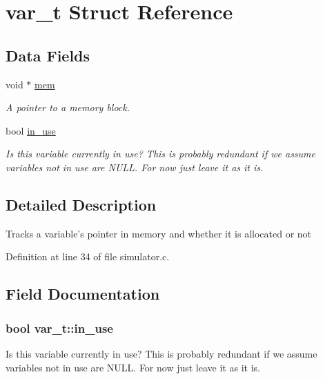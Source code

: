 \hypertarget{structvar__t}{\section{var\-\_\-t Struct Reference}
\label{structvar__t}
}
\subsection*{Data Fields}
\begin{DoxyCompactItemize}
\item 
void $\ast$ \hyperlink{structvar__t_a10c34ec2d6e86f971cf9702a4651267d}{mem}
\begin{DoxyCompactList}\small\item\em A pointer to a memory block. \end{DoxyCompactList}\item 
bool \hyperlink{structvar__t_ac304039a94e589f7d11f4ec3353abab4}{in\-\_\-use}
\begin{DoxyCompactList}\small\item\em Is this variable currently in use? This is probably redundant if we assume variables not in use are N\-U\-L\-L. For now just leave it as it is. \end{DoxyCompactList}\end{DoxyCompactItemize}


\subsection{Detailed Description}
Tracks a variable's pointer in memory and whether it is allocated or not 

Definition at line 34 of file simulator.\-c.



\subsection{Field Documentation}
\hypertarget{structvar__t_ac304039a94e589f7d11f4ec3353abab4}{
\subsubsection[{in\-\_\-use}]{\setlength{\rightskip}{0pt plus 5cm}bool var\-\_\-t\-::in\-\_\-use}}\label{structvar__t_ac304039a94e589f7d11f4ec3353abab4}


Is this variable currently in use? This is probably redundant if we assume variables not in use are N\-U\-L\-L. For now just leave it as it is. 



